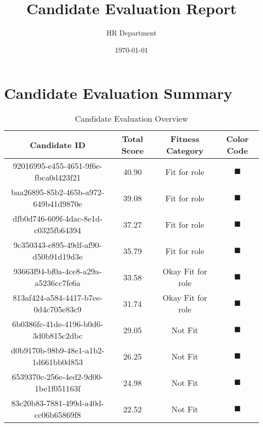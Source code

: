 \documentclass{article}
\title{\Huge\bfseries Candidate Evaluation Report}
\author{\Large HR Department}
\date{\Large\today}
\begin{document}
\maketitle
\thispagestyle{empty}

\newpage

\section{Candidate Evaluation Summary}

\begin{table}[htbp]
\centering
\begin{tabular}{cccc}
\toprule
\textbf{Candidate ID} & \textbf{Total Score} & \textbf{Fitness Category} & \textbf{Color Code} \\
\midrule
92016995-e455-4651-9f6e-fbca0d423f21 & 40.90 & Fit for role & \textcolor{fitcolor}{$\blacksquare$} \\
baa26895-85b2-465b-a972-649b41d9870e & 39.08 & Fit for role & \textcolor{fitcolor}{$\blacksquare$} \\
dfb0d746-609f-4dac-8e1d-c0325fb64394 & 37.27 & Fit for role & \textcolor{fitcolor}{$\blacksquare$} \\
9c350343-e895-49df-af90-d50b91d19d3e & 35.79 & Fit for role & \textcolor{fitcolor}{$\blacksquare$} \\
93663f94-bf0a-4ce8-a29a-a5236cc7fe6a & 33.58 & Okay Fit for role & \textcolor{okaycolor}{$\blacksquare$} \\
813af424-a584-4417-b7ee-0d4c705e83c9 & 31.74 & Okay Fit for role & \textcolor{okaycolor}{$\blacksquare$} \\
6b0386fc-41de-4196-b0d6-3d0b815c2dbc & 29.05 & Not Fit & \textcolor{notfitcolor}{$\blacksquare$} \\
d0b9170b-98b9-48e1-a1b2-1d661bb0d853 & 26.25 & Not Fit & \textcolor{notfitcolor}{$\blacksquare$} \\
6539370c-256e-4ed2-9d00-1be1f051163f & 24.98 & Not Fit & \textcolor{notfitcolor}{$\blacksquare$} \\
83c20b83-7881-499d-a40d-cc06b65869f8 & 22.52 & Not Fit & \textcolor{notfitcolor}{$\blacksquare$} \\
\bottomrule
\end{tabular}
\caption{Candidate Evaluation Overview}
\label{tab:candidate-overview}
\end{table}
\end{document}
